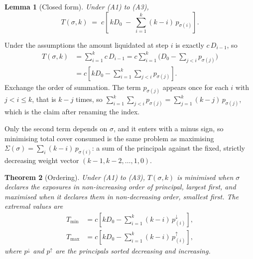 \documentclass[11pt]{article}
\makeatletter
\theoremstyle{orma}
\newtheorem{theorem}{Theorem}
\newtheorem{lemma}[theorem]{Lemma}
\theoremstyle{ormaupright}
\renewenvironment{proof}[1][\proofname]{%
  \par\addvspace{5pt}%
  \pushQED{\qed}%
  \normalfont
  \list{}{\leftmargin=1.8em \rightmargin=0pt \topsep=0pt
          \parsep=\parskip \itemsep=0pt \labelwidth=0pt \labelsep=0pt}%
  \item[]\relax
  {\itshape #1\@addpunct{.}}\hspace{0.75em}\ignorespaces
}{%
  \popQED\endlist\@endpefalse\addvspace{5pt}%
}
\makeatother
\begin{document}
\begin{lemma}[Closed form]
\label{lem:closed}
Under (A1) to (A3),
\begin{equation}
\label{eq:closed}
  T(\sigma, k)
  \;=\; c \left[\, k D_0 \;-\; \sum_{i=1}^{k} (k - i)\, p_{\sigma(i)} \right].
\end{equation}
\end{lemma}

\begin{proof}
Under the assumptions the amount liquidated at step $i$ is exactly $c \, D_{i-1}$, so
\begin{align}
  T(\sigma, k)
  &= \sum_{i=1}^{k} c \, D_{i-1}
   = c \sum_{i=1}^{k} \Big( D_0 - \sum_{j<i} p_{\sigma(j)} \Big)
  \\[6pt]
  &= c \left[ k D_0 - \sum_{i=1}^{k} \sum_{j<i} p_{\sigma(j)} \right].
\end{align}
Exchange the order of summation. The term $p_{\sigma(j)}$ appears once for each $i$ with
$j < i \leq k$, that is $k - j$ times, so
$\sum_{i=1}^{k} \sum_{j<i} p_{\sigma(j)} = \sum_{j=1}^{k} (k-j)\, p_{\sigma(j)}$, which is
the claim after renaming the index.
\end{proof}

Only the second term depends on $\sigma$, and it enters with a minus sign, so minimising
total cover consumed is the same problem as maximising
$\Sigma(\sigma) = \sum_i (k-i)\, p_{\sigma(i)}$: a sum of the principals against the fixed,
strictly decreasing weight vector $(k-1, k-2, \ldots, 1, 0)$.

\begin{theorem}[Ordering]
\label{thm:order}
Under (A1) to (A3), $T(\sigma, k)$ is minimised when $\sigma$ declares the exposures in
non-increasing order of principal, largest first, and maximised when it declares them in
non-decreasing order, smallest first. The extremal values are
\begin{align}
  T_{\min} &= c \left[ k D_0 - \sum_{i=1}^{k} (k-i)\, p_{(i)}^{\downarrow} \right],
  \\[6pt]
  T_{\max} &= c \left[ k D_0 - \sum_{i=1}^{k} (k-i)\, p_{(i)}^{\uparrow} \right],
\end{align}
where $p^{\downarrow}$ and $p^{\uparrow}$ are the principals sorted decreasing and
increasing.
\end{theorem}
\end{document}
